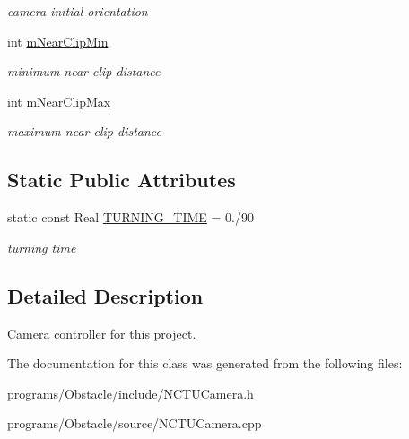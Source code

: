 \begin{DoxyCompactItemize}
\begin{DoxyCompactList}\small\item\em camera initial orientation \end{DoxyCompactList}\item 
int \hyperlink{class_n_c_t_u_camera_af97c1ee5da887f581940ad33c9d42dc5}{m\+Near\+Clip\+Min}\hypertarget{class_n_c_t_u_camera_af97c1ee5da887f581940ad33c9d42dc5}{}\label{class_n_c_t_u_camera_af97c1ee5da887f581940ad33c9d42dc5}

\begin{DoxyCompactList}\small\item\em minimum near clip distance \end{DoxyCompactList}\item 
int \hyperlink{class_n_c_t_u_camera_ac2144233de8a94f1aee27567750f0b7a}{m\+Near\+Clip\+Max}\hypertarget{class_n_c_t_u_camera_ac2144233de8a94f1aee27567750f0b7a}{}\label{class_n_c_t_u_camera_ac2144233de8a94f1aee27567750f0b7a}

\begin{DoxyCompactList}\small\item\em maximum near clip distance \end{DoxyCompactList}\end{DoxyCompactItemize}
\subsection*{Static Public Attributes}
\begin{DoxyCompactItemize}
\item 
static const Real \hyperlink{class_n_c_t_u_camera_a1aba52f772c07e125be557b1e91da5c0}{T\+U\+R\+N\+I\+N\+G\+\_\+\+T\+I\+ME} = 0./90\hypertarget{class_n_c_t_u_camera_a1aba52f772c07e125be557b1e91da5c0}{}\label{class_n_c_t_u_camera_a1aba52f772c07e125be557b1e91da5c0}

\begin{DoxyCompactList}\small\item\em turning time \end{DoxyCompactList}\end{DoxyCompactItemize}


\subsection{Detailed Description}
Camera controller for this project. 

The documentation for this class was generated from the following files\+:\begin{DoxyCompactItemize}
\item 
programs/\+Obstacle/include/N\+C\+T\+U\+Camera.\+h\item 
programs/\+Obstacle/source/N\+C\+T\+U\+Camera.\+cpp\end{DoxyCompactItemize}
